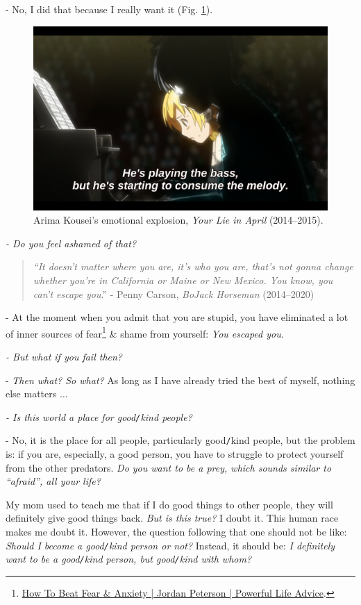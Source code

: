 \documentclass[12pt,twoside]{book}
\begin{document}
- No, I did that because I really want it (Fig. \ref{fig4}).
\begin{figure}[H]
	\centering
	\includegraphics[width = 12cm]{Arima_Kousei_emotional_explosion}
	\caption{{\sf Arima Kousei}'s emotional explosion, {\it Your Lie in April} (2014--2015).}
	\label{fig4}
\end{figure}

{\it - Do you feel ashamed of that?}

\begin{quote}
	{\it``It doesn't matter where you are, it's who you are, that's not gonna change whether you're in California or Maine or New Mexico. You know, you can't escape you}.'' - Penny Carson, {\it BoJack Horseman} (2014--2020)
\end{quote}

- At the moment when you admit that you are stupid, you have eliminated a lot of inner sources of fear\footnote{\href{https://www.youtube.com/watch?v=bb9g9mtDHZo}{How To Beat Fear \& Anxiety | Jordan Peterson | Powerful Life Advice}.} \& shame from yourself: {\it You escaped you}.

{\it - But what if you fail then?}

- {\it Then what? So what?} As long as I have already tried the best of myself, nothing else matters $\ldots$

{\it - Is this world a place for good{\tt/}kind people?}

- No, it is the place for all people, particularly good{\tt/}kind people, but the problem is: if you are, especially, a good person, you have to struggle to protect yourself from the other predators. {\it Do you want to be a prey, which sounds similar to ``afraid'', all your life?} 

My mom used to teach me that if I do good things to other people, they will definitely give good things back. {\it But is this true?} I doubt it. This human race makes me doubt it. However, the question following that one should not be like: {\it Should I become a good{\tt/}kind person or not?} Instead, it should be: {\it I definitely want to be a good{\tt/}kind person, but good{\tt/}kind with whom?}
\end{document}
